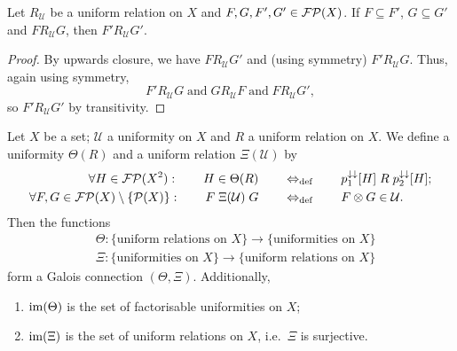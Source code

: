 \begin{lemma} \label{uniformRelationUpwardsClosure}
Let $R_\mathcal{U}$ be a uniform relation on $X$ and $F,G, F', G'\in\operatorname{\mathcal{FP}}(X)$. If $F \subseteq F'$, $G\subseteq G'$ and $F\mathrel{R_\mathcal{U}} G$, then $F'\mathrel{R_\mathcal{U}} G'$.
\end{lemma}
\begin{proof}
By upwards closure, we have $F\mathrel{R_\mathcal{U}} G'$ and  (using symmetry) $F'\mathrel{R_\mathcal{U}} G$. Thus, again using symmetry,
\[ F'\mathrel{R_\mathcal{U}} G \;\text{and}\; G \mathrel{R_\mathcal{U}} F \;\text{and}\; F \mathrel{R_\mathcal{U}} G', \]
so $F'\mathrel{R_\mathcal{U}} G'$ by transitivity.
\end{proof}

\begin{proposition} \label{uniformRelationGaloisConnection}
Let $X$ be a set; $\mathcal{U}$ a uniformity on $X$ and $R$ a uniform relation on $X$. We define a uniformity $\Theta(R)$ and a uniform relation $\Xi(\mathcal{U})$ by
\begin{align*}
\forall H\in \operatorname{\mathcal{FP}}(X^2):\qquad H\in\Theta(R) \quad&\quad\Leftrightarrow_{\text{def}}\quad\quad p_1^{\downarrow\downarrow}[H]\mathrel{R}p_2^{\downarrow\downarrow}[H]; \\
\forall F,G\in\operatorname{\mathcal{FP}}(X)\setminus\{\operatorname{\mathcal{P}}(X)\}:\qquad F\mathrel{\Xi(\mathcal{U})}G \quad&\quad\Leftrightarrow_{\text{def}}\quad\quad F\otimes G\in \mathcal{U}. 
\end{align*}
Then the functions
\begin{align*}
&\Theta: \{\text{uniform relations on $X$}\} \to \{\text{uniformities on $X$}\} \\
&\Xi: \{\text{uniformities on $X$}\} \to \{\text{uniform relations on $X$}\}
\end{align*}
form a Galois connection $(\Theta, \Xi)$. Additionally,
\begin{enumerate}
\item $\operatorname{im}(\Theta)$ is the set of factorisable uniformities on $X$;
\item $\operatorname{im}(\Xi)$ is the set of uniform relations on $X$, i.e.\ $\Xi$ is surjective.
\end{enumerate}
\end{proposition}
